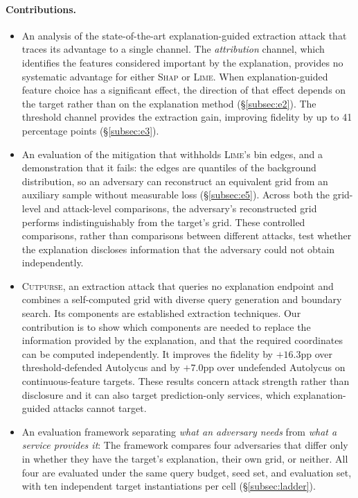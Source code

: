 \documentclass[sigconf,anonymous,review]{acmart}
\newcommand{\sys}{\textsc{Cutpurse}}
\begin{document}
\paragraph{Contributions.}
\begin{itemize}
  \item An analysis of the state-of-the-art explanation-guided extraction attack that traces its
  advantage to a single channel. The \emph{attribution} channel, which identifies the features considered important by the explanation, provides no systematic advantage for either \textsc{Shap} or \textsc{Lime}. When explanation-guided feature choice has a significant effect, the direction of that effect depends on the target rather than on the explanation method (\S\ref{subsec:e2}). The threshold channel provides the extraction gain, improving fidelity by up to 41 percentage points (\S\ref{subsec:e3}).
  \item An evaluation of the mitigation that withholds \textsc{Lime}'s bin edges, and a demonstration that it fails: the edges are quantiles of the background distribution, so an adversary can reconstruct an equivalent grid from an auxiliary sample without measurable loss (\S\ref{subsec:e5}). Across both the grid-level and attack-level comparisons, the adversary's reconstructed grid performs indistinguishably from the target's grid. These controlled comparisons, rather than comparisons between different attacks, test whether the explanation discloses information that the adversary could not obtain independently.
  \item \sys, an extraction attack that queries no explanation endpoint and combines a self-computed grid with diverse query generation and boundary search. Its components are established extraction techniques. Our contribution is to show which components are needed to replace the information provided by the explanation, and that the required coordinates can be computed independently. It improves the fidelity by $+16.3$pp over threshold-defended Autolycus and by $+7.0$pp over undefended Autolycus on continuous-feature targets. These results concern attack strength rather than disclosure and it can also target prediction-only services, which explanation-guided attacks cannot target.
  \item An evaluation framework separating \emph{what an adversary needs} from \emph{what a service provides
  it}: The framework compares four adversaries that differ only in whether they have the target's explanation, their own grid, or neither. All four are evaluated under the same query budget, seed set, and evaluation set, with ten independent target instantiations per cell (\S\ref{subsec:ladder}).
\end{itemize}
\end{document}
